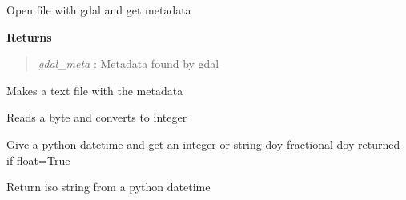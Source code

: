 \documentclass[letterpaper,10pt,openany,oneside]{sphinxmanual}
\begin{document}
\begin{fulllineitems}

\begin{fulllineitems}
\label{code:Metadata.Metadata.getgdalmeta}
Open file with gdal and get metadata

\textbf{Returns}
\begin{quote}

\emph{gdal\_meta} : Metadata found by gdal
\end{quote}

\end{fulllineitems}


\begin{fulllineitems}
\label{code:Metadata.Metadata.saveMetaFile}
Makes a text file with the metadata

\end{fulllineitems}


\end{fulllineitems}


\begin{fulllineitems}
\label{code:Metadata.byte2int}
Reads a byte and converts to integer

\end{fulllineitems}


\begin{fulllineitems}
\label{code:Metadata.date2doy}
Give a python datetime and get an integer or string doy fractional doy returned if float=True

\end{fulllineitems}


\begin{fulllineitems}
\label{code:Metadata.datetime2iso}
Return iso string from a python datetime

\end{fulllineitems}
\end{document}
